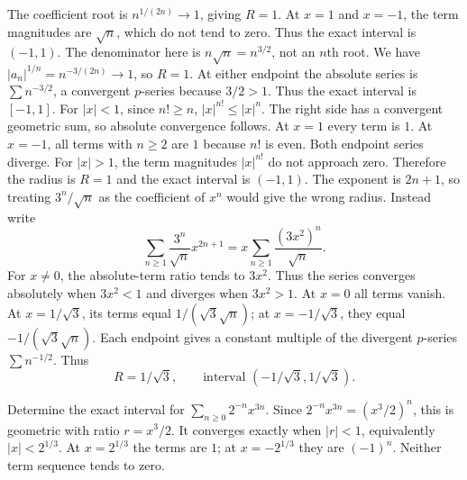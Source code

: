 The coefficient root is $n^{1/(2n)}\to1$, giving $R=1$.
At $x=1$ and $x=-1$, the term magnitudes are $\sqrt n$, which do
not tend to zero. Thus the exact interval is $\boxed{(-1,1)}$.
The denominator here is $n\sqrt n=n^{3/2}$, not an $n$th root.
We have $|a_n|^{1/n}=n^{-3/(2n)}\to1$, so $R=1$.
At either endpoint the absolute series is $\sum n^{-3/2}$, a
convergent $p$-series because $3/2>1$. Thus the exact interval is
$\boxed{[-1,1]}$.
For $|x|<1$, since $n!\ge n$,
$|x|^{n!}\le|x|^n$. The right side has a convergent geometric sum,
so absolute convergence follows. At $x=1$ every term is $1$.
At $x=-1$, all terms with $n\ge2$ are $1$ because $n!$ is even.
Both endpoint series diverge. For $|x|>1$, the term magnitudes
$|x|^{n!}$ do not approach zero. Therefore the radius is $R=1$ and
the exact interval is $\boxed{(-1,1)}$.
The exponent is $2n+1$, so treating $3^n/\sqrt n$ as the coefficient
of $x^n$ would give the wrong radius. Instead write
\[
 \sum_{n\ge1}\frac{3^n}{\sqrt n}x^{2n+1}
 =x\sum_{n\ge1}\frac{(3x^2)^n}{\sqrt n}.
\]
For $x\ne0$, the absolute-term ratio tends to $3x^2$. Thus the series
converges absolutely when $3x^2<1$ and diverges when $3x^2>1$.
At $x=0$ all terms vanish. At $x=1/\sqrt3$, its terms equal
$1/(\sqrt3\sqrt n)$; at $x=-1/\sqrt3$, they equal
$-1/(\sqrt3\sqrt n)$. Each endpoint gives a constant multiple of the
divergent $p$-series $\sum n^{-1/2}$. Thus
\[
 \boxed{R=1/\sqrt3,\qquad\text{interval }(-1/\sqrt3,1/\sqrt3).}
\]

\goal Determine the exact interval for $\sum_{n\ge0}2^{-n}x^{3n}$.
Since $2^{-n}x^{3n}=(x^3/2)^n$, this is geometric with ratio
$r=x^3/2$. It converges exactly when $|r|<1$, equivalently
$|x|<2^{1/3}$. At $x=2^{1/3}$ the terms are $1$; at
$x=-2^{1/3}$ they are $(-1)^n$. Neither term sequence tends to zero.


